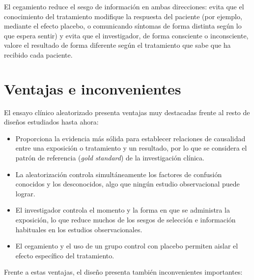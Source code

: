 \documentclass[
  spanish,
  a4paper,
]{scrreport}
\providecommand{\tightlist}{%
  \setlength{\itemsep}{0pt}\setlength{\parskip}{0pt}}
\theoremstyle{definition}
\theoremstyle{definition}
\theoremstyle{remark}
\begin{document}
\begin{tcolorbox}[enhanced jigsaw, arc=.35mm, bottomrule=.15mm, bottomtitle=1mm, breakable, colback=white, colbacktitle=quarto-callout-note-color!10!white, colframe=quarto-callout-note-color-frame, coltitle=black, left=2mm, leftrule=.75mm, opacityback=0, opacitybacktitle=0.6, rightrule=.15mm, title=\textcolor{quarto-callout-note-color}{\faInfo}\hspace{0.5em}{Interpretación}, titlerule=0mm, toprule=.15mm, toptitle=1mm]

El cegamiento reduce el sesgo de información en ambas direcciones: evita
que el conocimiento del tratamiento modifique la respuesta del paciente
(por ejemplo, mediante el efecto placebo, o comunicando síntomas de
forma distinta según lo que espera sentir) y evita que el investigador,
de forma consciente o inconsciente, valore el resultado de forma
diferente según el tratamiento que sabe que ha recibido cada paciente.

\end{tcolorbox}

\section{Ventajas e inconvenientes}\label{ventajas-e-inconvenientes-5}

El ensayo clínico aleatorizado presenta ventajas muy destacadas frente
al resto de diseños estudiados hasta ahora:

\begin{itemize}
\tightlist
\item
  Proporciona la evidencia más sólida para establecer relaciones de
  causalidad entre una exposición o tratamiento y un resultado, por lo
  que se considera el patrón de referencia (\emph{gold standard}) de la
  investigación clínica.
\item
  La aleatorización controla simultáneamente los factores de confusión
  conocidos y los desconocidos, algo que ningún estudio observacional
  puede lograr.
\item
  El investigador controla el momento y la forma en que se administra la
  exposición, lo que reduce muchos de los sesgos de selección e
  información habituales en los estudios observacionales.
\item
  El cegamiento y el uso de un grupo control con placebo permiten aislar
  el efecto específico del tratamiento.
\end{itemize}

Frente a estas ventajas, el diseño presenta también inconvenientes
importantes:
\end{document}
